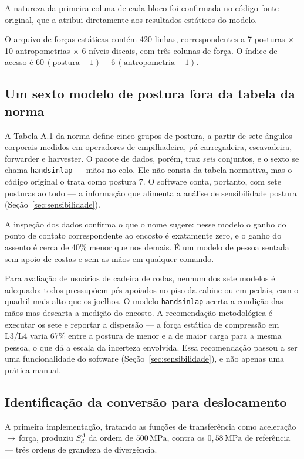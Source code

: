 \documentclass[11pt,a4paper]{article}
\newcommand{\code}[1]{\texttt{\small #1}}
\newcommand{\unit}[2]{\ensuremath{#1\,\mathrm{#2}}}
\begin{document}
A natureza da primeira coluna de cada bloco foi confirmada no código-fonte
original, que a atribui diretamente aos resultados estáticos do modelo.

O arquivo de forças estáticas contém 420 linhas, correspondentes a 7 posturas
$\times$ 10 antropometrias $\times$ 6 níveis discais, com três colunas de força.
O índice de acesso é $60\,(\mathrm{postura}-1) + 6\,(\mathrm{antropometria}-1)$.

\subsection{Um sexto modelo de postura fora da tabela da norma}

A Tabela A.1 da norma define cinco grupos de postura, a partir de sete ângulos
corporais medidos em operadores de empilhadeira, pá carregadeira, escavadeira,
forwarder e harvester. O pacote de dados, porém, traz \emph{seis} conjuntos, e o
sexto se chama \code{handsinlap} --- mãos no colo. Ele não consta da tabela
normativa, mas o código original o trata como postura 7. O software conta,
portanto, com sete posturas ao todo --- a informação que alimenta a análise de
sensibilidade postural (Seção~\ref{sec:sensibilidade}).

A inspeção dos dados confirma o que o nome sugere: nesse modelo o ganho do
ponto de contato correspondente ao encosto é exatamente zero, e o ganho do
assento é cerca de 40\% menor que nos demais. É um modelo de pessoa sentada sem
apoio de costas e sem as mãos em qualquer comando.

Para avaliação de usuários de cadeira de rodas, nenhum dos sete modelos é
adequado: todos pressupõem pés apoiados no piso da cabine ou em pedais, com o
quadril mais alto que os joelhos. O modelo \code{handsinlap} acerta a condição
das mãos mas descarta a medição do encosto. A recomendação metodológica é
executar os sete e reportar a dispersão --- a força estática de compressão em
L3/L4 varia 67\% entre a postura de menor e a de maior carga para a mesma
pessoa, o que dá a escala da incerteza envolvida. Essa recomendação passou a ser
uma funcionalidade do software (Seção~\ref{sec:sensibilidade}), e não apenas uma
prática manual.

\subsection{Identificação da conversão para deslocamento}
\label{sec:descoberta}

A primeira implementação, tratando as funções de transferência como
aceleração\,$\rightarrow$\,força, produziu $S_d^A$ da ordem de
\unit{500}{MPa}, contra os \unit{0{,}58}{MPa} de referência --- três ordens de
grandeza de divergência.
\end{document}
